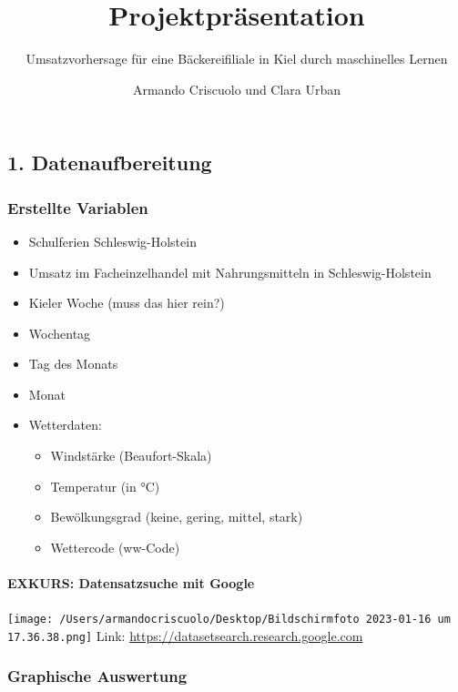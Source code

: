 \documentclass[
]{article}
\title{Projektpräsentation}
\subtitle{Umsatzvorhersage für eine Bäckereifiliale in Kiel durch
maschinelles Lernen}
\author{ Armando Criscuolo und Clara Urban}
\date{}
\providecommand{\tightlist}{%
  \setlength{\itemsep}{0pt}\setlength{\parskip}{0pt}}
\begin{document}
\maketitle

\hypertarget{datenaufbereitung}{%
\subsection{1. Datenaufbereitung}\label{datenaufbereitung}}

\hypertarget{erstellte-variablen}{%
\subsubsection{Erstellte Variablen}\label{erstellte-variablen}}

\begin{itemize}
\tightlist
\item
  Schulferien Schleswig-Holstein
\item
  Umsatz im Facheinzelhandel mit Nahrungsmitteln in Schleswig-Holstein
\item
  Kieler Woche (muss das hier rein?)
\item
  Wochentag
\item
  Tag des Monats
\item
  Monat
\item
  Wetterdaten:

  \begin{itemize}
  \tightlist
  \item
    Windstärke (Beaufort-Skala)
  \item
    Temperatur (in °C)
  \item
    Bewölkungsgrad (keine, gering, mittel, stark)
  \item
    Wettercode (ww-Code)
  \end{itemize}
\end{itemize}

\hypertarget{exkurs-datensatzsuche-mit-google}{%
\paragraph{EXKURS: Datensatzsuche mit
Google}\label{exkurs-datensatzsuche-mit-google}}

\texttt{[image: /Users/armandocriscuolo/Desktop/Bildschirm­foto 2023-01-16 um 17.36.38.png]}
Link: \url{https://datasetsearch.research.google.com}

\hypertarget{graphische-auswertung}{%
\subsubsection{Graphische Auswertung}\label{graphische-auswertung}}
\end{document}
